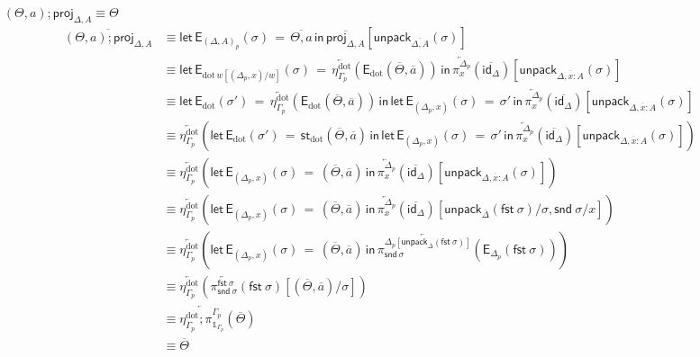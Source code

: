 \documentclass[10pt]{article}
\theoremstyle{definition}
\newcommand\dsd[1]{\ensuremath{\mathsf{#1}}}
\newcommand{\app}[2]{\ensuremath{#1 \: #2}}
\newcommand{\fst}[1]{\app{\dsd{fst}}{#1}}
\newcommand{\snd}[1]{\app{\dsd{snd}}{#1}}
\newcommand{\id}{\mathsf{id}}
\newcommand{\rewrite}[2]{\overleftarrow{#1}(#2)}
\newcommand\StI[2]{\ensuremath{\mathsf{st}_{#1}(#2)}}
\newcommand\EEs[4]{\ensuremath{\mathsf{let} \, \mathsf{E}_{#1}(#3) \, = \, {#2} \, \mathsf{in} \, #4}}
\newcommand\EIs[2]{\ensuremath{\mathsf{E}_{#1}{(#2)}}}
\newcommand\unpack[2]{\ensuremath{\mathsf{unpack}_{#1}(#2)}}
\newcommand{\modeof}[1]{{#1}_p}
\newcommand{\sdot}{\ensuremath{\mathrm{dot}}}
\newcommand{\upstairs}[1]{\overline{#1}}
\newcommand\proj[1]{\ensuremath{\mathsf{proj}_{#1}}}
\newcommand\One{\ensuremath{\mathds{1}}}
\begin{document}
\begin{enumerate}[style = multiline, labelwidth = 80pt]
\item[{$(\Theta, a);\proj{\Delta,A} \equiv \Theta$}]
\begin{align*}
\upstairs{(\Theta, a);\proj{\Delta,A}}
&\equiv \EEs{\modeof{(\Delta, A)}}{\upstairs{\Theta, a}}{\sigma}{\upstairs{\proj{\Delta,A}}[\unpack{\upstairs{\Delta, A}}{\sigma}]} \\
&\equiv \EEs{\sdot \, w[(\modeof{\Delta}, x)/w]}{\rewrite{\eta^\sdot_{\modeof{\Gamma}}}{\EIs{\sdot}{\upstairs{\Theta}, \upstairs{a}}}}{\sigma}{\rewrite{\pi^{\modeof{\Delta}}_x}{\upstairs{\id_\Delta}}[\unpack{\upstairs{\Delta, x : A}}{\sigma}]} \\
&\equiv \EEs{\sdot}{\rewrite{\eta^\sdot_{\modeof{\Gamma}}}{\EIs{\sdot}{\upstairs{\Theta}, \upstairs{a}}}}{\sigma'}{\EEs{(\modeof{\Delta}, x)}{\sigma'}{\sigma}{\rewrite{\pi^{\modeof{\Delta}}_x}{\upstairs{\id_\Delta}}[\unpack{\upstairs{\Delta, x : A}}{\sigma}]}} \\
&\equiv \rewrite{\eta^\sdot_{\modeof{\Gamma}}}{\EEs{\sdot}{\StI{\sdot}{\upstairs{\Theta}, \upstairs{a}}}{\sigma'}{\EEs{(\modeof{\Delta}, x)}{\sigma'}{\sigma}{\rewrite{\pi^{\modeof{\Delta}}_x}{\upstairs{\id_\Delta}}[\unpack{\upstairs{\Delta, x : A}}{\sigma}]}}} \\
&\equiv \rewrite{\eta^\sdot_{\modeof{\Gamma}}}{\EEs{(\modeof{\Delta}, x)}{(\upstairs{\Theta}, \upstairs{a})}{\sigma}{\rewrite{\pi^{\modeof{\Delta}}_x}{\upstairs{\id_\Delta}}[\unpack{\upstairs{\Delta, x : A}}{\sigma}]}} \\
&\equiv \rewrite{\eta^\sdot_{\modeof{\Gamma}}}{\EEs{(\modeof{\Delta}, x)}{(\upstairs{\Theta}, \upstairs{a})}{\sigma}{\rewrite{\pi^{\modeof{\Delta}}_x}{\upstairs{\id_\Delta}}[\unpack{\upstairs{\Delta}}{\fst \sigma}/\sigma, \snd \sigma / x]}} \\
&\equiv \rewrite{\eta^\sdot_{\modeof{\Gamma}}}{\EEs{(\modeof{\Delta}, x)}{(\upstairs{\Theta}, \upstairs{a})}{\sigma}{\rewrite{\pi^{\modeof{\Delta}[\unpack{\upstairs{\Delta}}{\fst \sigma}]}_{\snd \sigma}}{\EIs{\modeof{\Delta}}{\fst \sigma}}}} \\
&\equiv \rewrite{\eta^\sdot_{\modeof{\Gamma}}}{\rewrite{\pi^{\fst \sigma}_{\snd \sigma}}{\fst \sigma}[(\upstairs{\Theta}, \upstairs{a})/\sigma]} \\
&\equiv \rewrite{\eta^\sdot_{\modeof{\Gamma}};\pi^{\modeof{\Gamma}}_{\One_{\modeof{\Gamma}}}}{\upstairs{\Theta}} \\
&\equiv \upstairs{\Theta}
\end{align*}


\end{enumerate}
\end{document}
